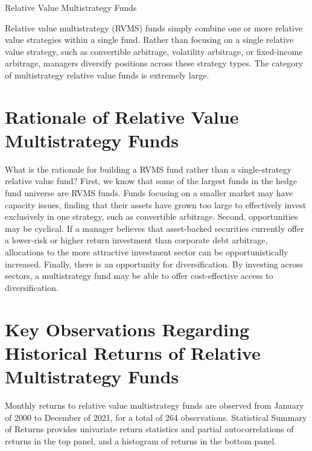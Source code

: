 \documentclass[11pt]{article}
\begin{document}
Relative Value Multistrategy Funds

Relative value multistrategy (RVMS) funds simply combine one or more relative value strategies within a single fund. Rather than focusing on a single relative value strategy, such as convertible arbitrage, volatility arbitrage, or fixed-income arbitrage, managers diversify positions across these strategy types. The category of multistrategy relative value funds is extremely large.

\section*{Rationale of Relative Value Multistrategy Funds}
What is the rationale for building a RVMS fund rather than a single-strategy relative value fund? First, we know that some of the largest funds in the hedge fund universe are RVMS funds. Funds focusing on a smaller market may have capacity issues, finding that their assets have grown too large to effectively invest exclusively in one strategy, such as convertible arbitrage. Second, opportunities may be cyclical. If a manager believes that asset-backed securities currently offer a lower-risk or higher return investment than corporate debt arbitrage, allocations to the more attractive investment sector can be opportunistically increased. Finally, there is an opportunity for diversification. By investing across sectors, a multistrategy fund may be able to offer cost-effective access to diversification.

\section*{Key Observations Regarding Historical Returns of Relative Multistrategy Funds}
Monthly returns to relative value multistrategy funds are observed from January of 2000 to December of 2021, for a total of 264 observations. Statistical Summary of Returns provides univariate return statistics and partial autocorrelations of returns in the top panel, and a histogram of returns in the bottom panel.
\end{document}
